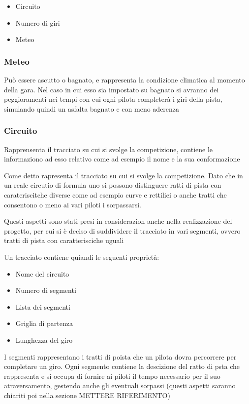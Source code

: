 \documentclass[a4paper,11pt, twoside]{book}
\begin{document}
      \begin{itemize}
	\item Circuito
	\item Numero di giri
	\item Meteo
      \end{itemize}
	
      \subsubsection{Meteo}
        Può essere ascutto o bagnato, e rappresenta la condizione climatica al momento della gara.
        Nel caso in cui esso sia impostato su bagnato si avranno dei peggioramenti nei tempi con cui ogni pilota
	completerà i giri della pista, simulando quindi un asfalta bagnato e con meno aderenza
	
      \subsubsection{Circuito}
        Rapprensenta il tracciato su cui si svolge la competizione, contiene le informaziono ad esso relativo come
	ad esempio il nome e la sua conformazione
	
        Come detto rapresenta il tracciato su cui si svolge la competizione. Dato che in un reale circutio di formula uno
	si possono distinguere ratti di pista con carateriscitche diverse come ad esempio curve e rettiliei o anche
	tratti che consentono o meno ai vari piloti i sorpassarsi.
	
	Questi aspetti sono stati presi in considerazion anche nella realizzazione del progetto, per cui si è deciso
	di suddividere il tracciato in vari segmenti, ovvero tratti di pista con caratterisciche uguali
	
	Un tracciato contiene quiandi le seguenti proprietà:
	
	\begin{itemize}
	  \item Nome del circuito
	  \item Numero di segmenti
	  \item Lista dei segmenti
	  \item Griglia di partenza
	  \item Lunghezza del giro
	\end{itemize}
	
	
	I segmenti rappresentano i tratti di poista che un pilota dovra percorrere per completare un giro.
	Ogni segmento contiene la descizione del ratto di psta che rappresenta e si occupa di
	fornire ai piloti il tempo necessario per il suo atraversamento, gestendo anche gli eventuali sorpassi 
	(questi aspetti saranno chiariti poi nella sezione METTERE RIFERIMENTO) 
	
\end{document}
